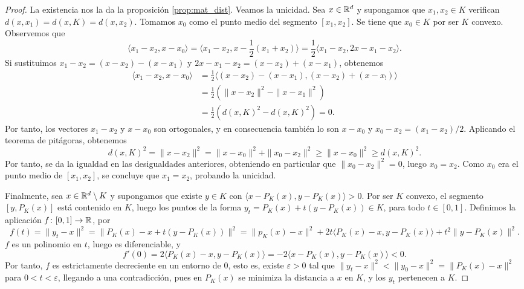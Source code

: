 \documentclass{book}
\begin{document}
\begin{proof}
	La existencia nos la da la proposición \ref{prop:mat_dist}. Veamos la unicidad. Sea $x \in \mathbb{R}^d$ y supongamos que $x_1,x_2 \in K$ verifican $d(x,x_1) = d(x,K) = d(x,x_2)$. Tomamos $x_0$ como el punto medio del segmento $[x_1,x_2]$. Se tiene que $x_0 \in K$ por ser $K$ convexo. Observemos que
	\[\langle x_1 - x_2, x - x_0 \rangle = \langle x_1 - x_2, x - \frac{1}{2}(x_1 + x_2) \rangle = \frac{1}{2}\langle x_1 - x_2, 2x - x_1 - x_2 \rangle.\]
	Si sustituimos $x_1 - x_2 = (x - x_2) - (x - x_1)$ y $2x - x_1 - x_2 = (x-x_2)+(x-x_1)$, obtenemos
	\begin{align*}
		\langle x_1 - x_2, x - x_0 \rangle &= \frac{1}{2} \langle (x - x_2) - (x-x_1), (x - x_2)+(x - x_!) \rangle\\
		                                   &= \frac{1}{2}(\|x - x_2\|^2 - \|x - x_1\|^2) \\
		                                   &= \frac{1}{2}(d(x,K)^2 - d(x,K)^2) = 0.
	\end{align*}
	Por tanto, los vectores $x_1 - x_2$ y $x - x_0$ son ortogonales, y en consecuencia también lo son $x - x_0$ y $x_0 - x_2 = (x_1 - x_2)/2$. Aplicando el teorema de pitágoras, obtenemos
	\[d(x,K)^2 = \|x - x_2\|^2 =  \|x - x_0\|^2 + \|x_0 - x_2\|^2 \ge \|x - x_0\|^2 \ge d(x,K)^2.\]
	Por tanto, se da la igualdad en las desigualdades anteriores, obteniendo en particular que $\|x_0 - x_2\|^2 = 0$, luego $x_0 = x_2$. Como $x_0$ era el punto medio de $[x_1,x_2]$, se concluye que $x_1 = x_2$, probando la unicidad.

	Finalmente, sea $x \in \mathbb{R}^d \setminus K$ y supongamos que existe $y \in K$ con $\langle x - P_K(x), y - P_K(x) \rangle > 0$. Por ser $K$ convexo, el segmento $[y,P_K(x)]$ está contenido en $K$, luego los puntos de la forma $y_t = P_K(x) + t(y - P_K(x)) \in K$, para todo $t \in [0,1]$. Definimos la aplicación $f \colon [0,1] \to \mathbb{R}$, por
	\[f(t) = \|y_t - x\|^2 = \|P_K(x) -x  + t(y - P_K(x))\|^2 = \|p_K(x) - x \|^2 + 2t\langle P_K(x)-x,y-P_K(x) \rangle + t^2\|y - P_K(x)\|^2. \]
	$f$ es un polinomio en $t$, luego es diferenciable, y
	\[f'(0) = 2\langle P_K(x)-x,y-P_K(x) \rangle = -2 \langle x - P_K(x), y - P_K(x) \rangle < 0.\]
	Por tanto, $f$ es estrictamente decreciente en un entorno de 0, esto es, existe $\varepsilon > 0$ tal que $\|y_t - x\|^2 < \|y_0 - x \|^2 = \|P_K(x) - x\|^2$ para $0 < t < \varepsilon$, llegando a una contradicción, pues en $P_K(x)$ se minimiza la distancia a $x$ en $K$, y los $y_t$ pertenecen a $K$.
\end{proof}
\end{document}
